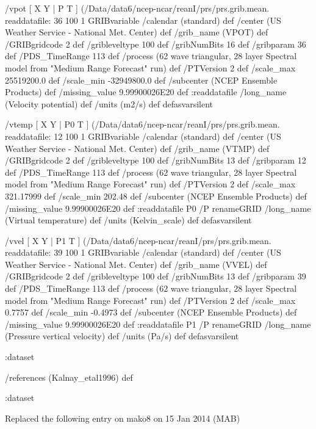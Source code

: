 \begin{ingrid}
  /vpot { [ X Y | P T ] (/Data/data6/ncep-ncar/reanI/prs/prs.grib.mean.%
  readdatafile:
  36 100 1 GRIBvariable
  /calendar (standard) def
  /center (US Weather Service - National Met. Center) def
  /grib_name (VPOT) def
  /GRIBgridcode 2 def
  /gribleveltype 100 def
  /gribNumBits 16 def
  /gribparam 36 def
  /PDS_TimeRange 113 def
  /process (62 wave triangular, 28 layer Spectral model from "Medium Range Forecast" run) def
  /PTVersion 2 def
  /scale_max 25519200.0 def
  /scale_min -32949800.0 def
  /subcenter (NCEP Ensemble Products) def
  /missing_value 9.99900026E20 def
  :readdatafile
  /long_name (Velocity potential) def
  /units (m2/s) def
  } defasvarsilent

  /vtemp { [ X Y | P0 T ] (/Data/data6/ncep-ncar/reanI/prs/prs.grib.mean.%
  readdatafile:
  12 100 1 GRIBvariable
  /calendar (standard) def
  /center (US Weather Service - National Met. Center) def
  /grib_name (VTMP) def
  /GRIBgridcode 2 def
  /gribleveltype 100 def
  /gribNumBits 13 def
  /gribparam 12 def
  /PDS_TimeRange 113 def
  /process (62 wave triangular, 28 layer Spectral model from "Medium Range Forecast" run) def
  /PTVersion 2 def
  /scale_max 321.17999 def
  /scale_min 202.48 def
  /subcenter (NCEP Ensemble Products) def
  /missing_value 9.99900026E20 def
  :readdatafile
  P0 /P renameGRID
  /long_name (Virtual temperature) def
  /units (Kelvin_scale) def
  } defasvarsilent

  /vvel { [ X Y | P1 T ] (/Data/data6/ncep-ncar/reanI/prs/prs.grib.mean.%
  readdatafile:
  39 100 1 GRIBvariable
  /calendar (standard) def
  /center (US Weather Service - National Met. Center) def
  /grib_name (VVEL) def
  /GRIBgridcode 2 def
  /gribleveltype 100 def
  /gribNumBits 13 def
  /gribparam 39 def
  /PDS_TimeRange 113 def
  /process (62 wave triangular, 28 layer Spectral model from "Medium Range Forecast" run) def
  /PTVersion 2 def
  /scale_max 0.7757 def
  /scale_min -0.4973 def
  /subcenter (NCEP Ensemble Products) def
  /missing_value 9.99900026E20 def
  :readdatafile
  P1 /P renameGRID
  /long_name (Pressure vertical velocity) def
  /units (Pa/s) def
  } defasvarsilent

 :dataset
  
 /references (Kalnay_etal1996) def

:dataset
\end{ingrid}

Replaced the following entry on mako8 on 15 Jan 2014 (MAB)

